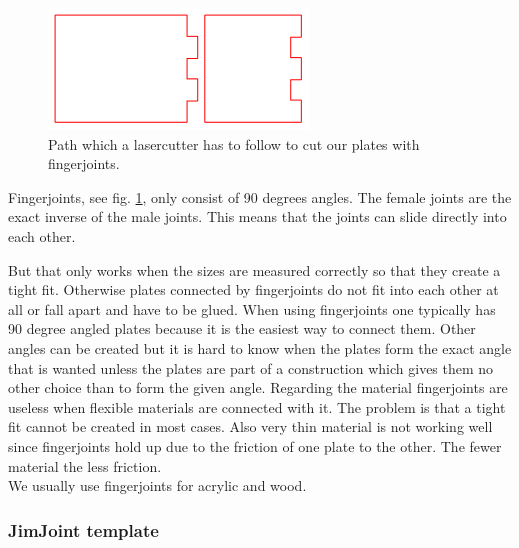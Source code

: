 \documentclass[../ClassicThesis.tex]{subfiles}
\begin{document}
\begin{figure}[!ht]
\centering
\includegraphics[width=.5\columnwidth]{Images/fingerjoints.png}
\caption{Path which a lasercutter has to follow to cut our plates with fingerjoints.}
\label{fig:fingerjoints}
\end{figure}


Fingerjoints, see fig. \ref{fig:fingerjoints}, only consist of 90 degrees angles. The female joints are the exact inverse of the male joints. This means that the joints can slide directly into each other. 

But that only works when the sizes are measured correctly so that they create a tight fit. Otherwise plates connected by fingerjoints do not fit into each other at all or fall apart and have to be glued. 
When using fingerjoints one typically has 90 degree angled plates because it is the easiest way to connect them. Other angles can be created but it is hard to know when the plates form the exact angle that is wanted unless the plates are part of a construction which gives them no other choice than to form the given angle.
Regarding the material fingerjoints are useless when flexible materials are connected with it. The problem is that a tight fit cannot be created in most cases. Also very thin material is not working well since fingerjoints hold up due to the friction of one plate to the other. The fewer material the less friction.\\
We usually use fingerjoints for acrylic and wood.


\subsubsection{JimJoint template}
\end{document}
